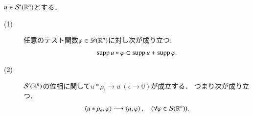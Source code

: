 	\begin{screen}
		\begin{thm}\label{thm:supp_of_tempered_distributions_1}
			$u \in \mathcal{S}'(\mathbb{R}^n)$とする．
			\begin{description}
				\item[(1)]	任意のテスト関数$\varphi \in \mathscr{D}(\mathbb{R}^n)$に対し次が成り立つ:
					\begin{align}
						\operatorname{supp} u \ast \varphi \subset \operatorname{supp} u + \operatorname{supp} \varphi.
						\label{eq:thm_supp_of_tempered_distributions_1}
					\end{align}
					
				\item[(2)] 
					$\mathcal{S}'(\mathbb{R}^n)$の位相に関して$u \ast \rho_\epsilon \longrightarrow u\ (\epsilon \longrightarrow 0)$が成立する．
					つまり次が成り立つ．
					\begin{align}
						\inprod<u \ast \rho_\epsilon,\varphi> \longrightarrow \inprod<u,\varphi>,
						\quad (\forall \varphi \in \rapid{\R^n}).
					\end{align}
			\end{description}
		\end{thm}
	\end{screen}
	
